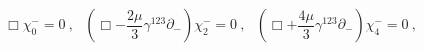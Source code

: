 \begin{equation}
\Box \chi^-_0 = 0 ~,~~~
( \Box - \frac{2 \mu}{3} \gamma^{123} \partial_- )
     \chi^-_2 = 0 ~,~~~
( \Box + \frac{4 \mu}{3} \gamma^{123} \partial_- )
     \chi^-_4 = 0 ~,
\label{fdia2}
\end{equation}


